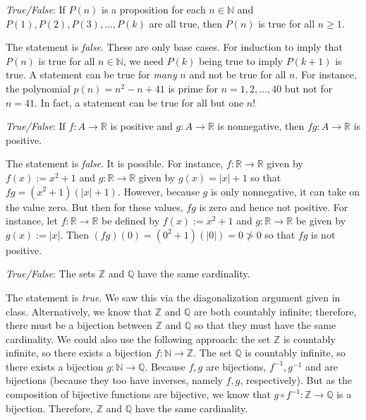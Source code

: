 \documentclass[11pt,letterpaper]{article}
\begin{document}
\quizsol \textit{True/False}: If $P(n)$ is a proposition for each $n \in \mathbb{N}$ and $P(1), P(2), P(3), \ldots, P(k)$ are all true, then $P(n)$ is true for all $n \geq 1$. \pspace

\sol The statement is \textit{false}. These are only base cases. For induction to imply that $P(n)$ is true for all $n \in \mathbb{N}$, we need $P(k)$ being true to imply $P(k+1)$ is true. A statement can be true for \textit{many} $n$ and not be true for all $n$. For instance, the polynomial $p(n)= n^2 - n + 41$ is prime for $n= 1, 2, \ldots, 40$ but not for $n= 41$. In fact, a statement can be true for all but one $n$!  \pvspace{1.5cm}



\quizsol \textit{True/False}: If $f: A \to \mathbb{R}$ is positive and $g: A \to \mathbb{R}$ is nonnegative, then $fg: A \to \mathbb{R}$ is positive. \pspace

\sol The statement is \textit{false}. It is possible. For instance, $f: \mathbb{R} \to \mathbb{R}$ given by $f(x):= x^2 + 1$ and $g: \mathbb{R} \to \mathbb{R}$ given by $g(x)= |x| + 1$ so that $fg= (x^2 + 1)(|x| + 1)$. However, because $g$ is only nonnegative, it can take on the value zero. But then for these values, $fg$ is zero and hence not positive. For instance, let $f: \mathbb{R} \to \mathbb{R}$ be defined by $f(x):= x^2 + 1$ and $g: \mathbb{R} \to \mathbb{R}$ be given by $g(x):= |x|$. Then $(fg)(0)= (0^2 + 1)(|0|)= 0 \not> 0$ so that $fg$ is not positive. \pvspace{1.5cm}



\quizsol \textit{True/False}: The sets $\mathbb{Z}$ and $\mathbb{Q}$ have the same cardinality. \pspace

\sol The statement is \textit{true}. We saw this via the diagonalization argument given in class. Alternatively, we know that $\mathbb{Z}$ and $\mathbb{Q}$ are both countably infinite; therefore, there must be a bijection between $\mathbb{Z}$ and $\mathbb{Q}$ so that they must have the same cardinality. We could also use the following approach: the set $\mathbb{Z}$ is countably infinite, so there exists a bijection $f: \mathbb{N} \to \mathbb{Z}$. The set $\mathbb{Q}$ is countably infinite, so there exists a bijection $g: \mathbb{N} \to \mathbb{Q}$. Because $f, g$ are bijections, $f^{-1}, g^{-1}$ and are bijections (because they too have inverses, namely $f, g$, respectively). But as the composition of bijective functions are bijective, we know that $g \circ f^{-1}: \mathbb{Z} \to \mathbb{Q}$ is a bijection. Therefore, $\mathbb{Z}$ and $\mathbb{Q}$ have the same cardinality. \pspace
\end{document}
